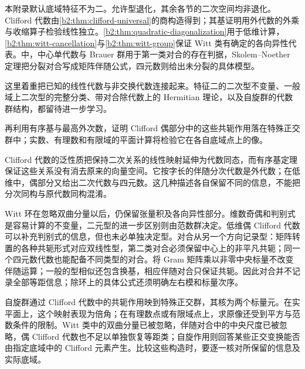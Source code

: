 \ProseParagraphBreak

本附录默认底域特征不为二。允许型退化，其余各节的二次空间均非退化。Clifford 代数由\cref{b2:thm:clifford-universal}的商构造得到；其基证明用外代数的外乘与收缩算子检验线性独立。\cref{b2:thm:quadratic-diagonalization}用于低维计算，\cref{b2:thm:witt-cancellation}与\cref{b2:thm:witt-group}保证 Witt 类有确定的各向异性代表。中，中心单代数与 Brauer 群用于第一类对合的存在判据，Skolem--Noether 定理把分裂对合写成矩阵伴随公式，四元数则给出未分裂的具体模型。

\ProseParagraphBreak
这里着重把已知的线性代数与非交换代数连接起来。特征二的二次型不变量、一般域上二次型的完整分类、带对合除代数上的 Hermitian 理论，以及自旋群的代数群结构，都留待进一步学习。

\ProseParagraphBreak
{}再利用有序基与最高外次数，证明 Clifford 偶部分中的这些共轭作用落在特殊正交群中；实数、有理数和有限域的平面计算将检验它在各自底域点上的像。






\begin{chaptersummary}
	Clifford 代数的泛性质把保持二次关系的线性映射延伸为代数同态，而有序基定理保证这些关系没有消去原来的向量空间。它按字长的伴随分次代数是外代数；在低维中，偶部分又给出二次代数与四元数。这几种描述各自保留不同的信息，不能把分次同构与原代数同构混淆。

	\ProseParagraphBreak
	Witt 环在忽略双曲分量以后，仍保留张量积及各向异性部分。维数奇偶和判别式是容易计算的不变量，二元型的进一步区别则由范数群决定。低维偶 Clifford 代数可以补充判别式的信息，但也未必单独决定型。对合从另一个方向记录型：矩阵转置的各种共轭形式对应双线性型，第二类对合必须保留中心上的非平凡共轭；同一个四元数代数也能配备不同类型的对合。将 Gram 矩阵乘以非零中央标量不改变伴随运算；一般的型相似还包含换基，相应伴随对合只保证共轭。因此对合并不记录全部等距信息；除环上的具体公式还须明确左右模和标量次序。

	\ProseParagraphBreak
	自旋群通过 Clifford 代数中的共轭作用映到特殊正交群，其核为两个标量元。在实平面上，这个映射表现为倍角；在有理数点或有限域点上，求原像还受到平方与范数条件的限制。Witt 类中的双曲分量已被忽略，伴随对合中的中央尺度已被忽略，偶 Clifford 代数也不足以单独恢复等距类；自旋作用则回答某些正交变换能否由指定底域中的 Clifford 元素产生。比较这些构造时，要逐一核对所保留的信息及实际底域。
\end{chaptersummary}

